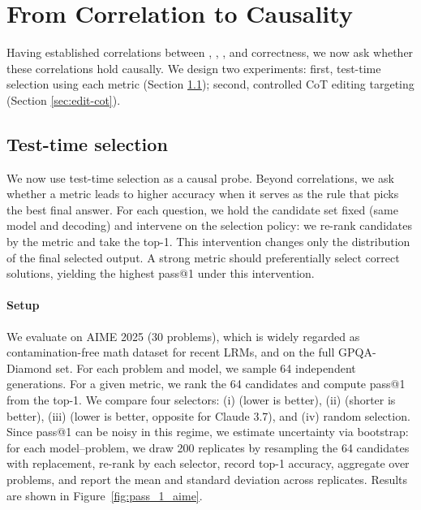 \section{From Correlation to Causality}

Having established correlations between \Length, \rr, \failedstep, and correctness, we now ask whether these correlations hold causally. We design two experiments: first, test-time selection using each metric (Section \ref{sec:test-time-select}); second, controlled CoT editing targeting \fsf (Section \ref{sec:edit-cot}).

\subsection{Test-time selection}\label{sec:test-time-select}

{We now use test-time selection as a causal probe. Beyond correlations, we ask whether a metric leads to higher accuracy when it serves as the rule that picks the best final answer. For each question, we hold the candidate set fixed (same model and decoding) and intervene on the selection policy: we re-rank candidates by the metric and take the top-1. This intervention changes only the distribution of the final selected output. A strong metric should preferentially select correct solutions, yielding the highest pass@1 under this intervention.}

\paragraph{Setup} We evaluate on AIME 2025 (30 problems), which is widely regarded as contamination-free math dataset for recent LRMs, and on the full GPQA-Diamond set. For each problem and model, we sample 64 independent generations. For a given metric, we rank the 64 candidates and compute pass@1 from the top-1. We compare four selectors: (i) \fsf (lower is better), (ii) \Length (shorter is better), (iii) \rr (lower is better, opposite for Claude 3.7), and (iv) random selection. Since pass@1 can be noisy in this regime, we estimate uncertainty via bootstrap: for each model–problem, we draw 200 replicates by resampling the 64 candidates with replacement, re-rank by each selector, record top-1 accuracy, aggregate over problems, and report the mean and standard deviation across replicates. Results are shown in Figure~\ref{fig:pass_1_aime}. 

